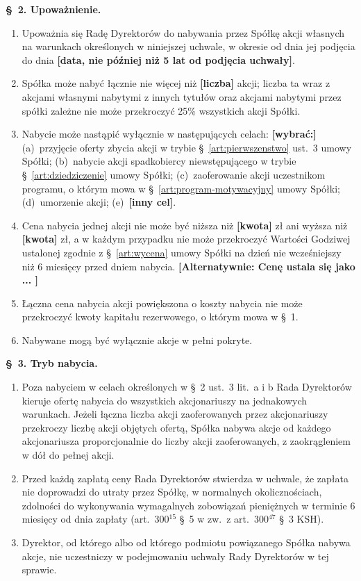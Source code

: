 \documentclass[12pt,a4paper]{report}
\newcommand{\field}[1]{\textbf{[#1]}}
\begin{document}
\textbf{§~2. Upoważnienie.}
\begin{enumerate}
  \item Upoważnia się Radę Dyrektorów do nabywania przez Spółkę akcji własnych na warunkach określonych w niniejszej uchwale, w okresie od dnia jej podjęcia do dnia \field{data, nie później niż 5 lat od podjęcia uchwały}.
  \item Spółka może nabyć łącznie nie więcej niż \field{liczba} akcji; liczba ta wraz z akcjami własnymi nabytymi z innych tytułów oraz akcjami nabytymi przez spółki zależne nie może przekroczyć 25\% wszystkich akcji Spółki.
  \item Nabycie może nastąpić wyłącznie w następujących celach: \field{wybrać:} (a)~przyjęcie oferty zbycia akcji w trybie §~\ref{art:pierwszenstwo} ust.~3 umowy Spółki; (b)~nabycie akcji spadkobiercy niewstępującego w trybie §~\ref{art:dziedziczenie} umowy Spółki; (c)~zaoferowanie akcji uczestnikom programu, o którym mowa w §~\ref{art:program-motywacyjny} umowy Spółki; (d)~umorzenie akcji; (e)~\field{inny cel}.
  \item Cena nabycia jednej akcji nie może być niższa niż \field{kwota} zł ani wyższa niż \field{kwota} zł, a w każdym przypadku nie może przekroczyć Wartości Godziwej ustalonej zgodnie z §~\ref{art:wycena} umowy Spółki na dzień nie wcześniejszy niż 6 miesięcy przed dniem nabycia. \field{Alternatywnie: Cenę ustala się jako ... }
  \item Łączna cena nabycia akcji powiększona o koszty nabycia nie może przekroczyć kwoty kapitału rezerwowego, o którym mowa w §~1.
  \item Nabywane mogą być wyłącznie akcje w pełni pokryte.
\end{enumerate}

\textbf{§~3. Tryb nabycia.}
\begin{enumerate}
  \item Poza nabyciem w celach określonych w §~2 ust.~3 lit.~a i b Rada Dyrektorów kieruje ofertę nabycia do wszystkich akcjonariuszy na jednakowych warunkach. Jeżeli łączna liczba akcji zaoferowanych przez akcjonariuszy przekroczy liczbę akcji objętych ofertą, Spółka nabywa akcje od każdego akcjonariusza proporcjonalnie do liczby akcji zaoferowanych, z zaokrągleniem w dół do pełnej akcji.
  \item Przed każdą zapłatą ceny Rada Dyrektorów stwierdza w uchwale, że zapłata nie doprowadzi do utraty przez Spółkę, w normalnych okolicznościach, zdolności do wykonywania wymagalnych zobowiązań pieniężnych w terminie 6 miesięcy od dnia zapłaty (art.~300$^{15}$ §~5 w zw.\ z art.~300$^{47}$ §~3 KSH).
  \item Dyrektor, od którego albo od którego podmiotu powiązanego Spółka nabywa akcje, nie uczestniczy w podejmowaniu uchwały Rady Dyrektorów w tej sprawie.
\end{enumerate}
\end{document}
